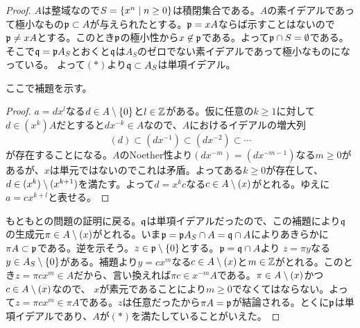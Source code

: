 \subsubsection{}%
\begin{proof}
  $A$は整域なので$S = \left\{ x^n \mathrel{} \middle| \mathrel{} n \geq 0 \right\}$は積閉集合である。$A$の素イデアルであって極小なもの$\mathfrak{p} \subset A$が与えられたとする。$\mathfrak{p} = xA$ならば示すことはないので$\mathfrak{p} \neq xA$とする。このとき$\mathfrak{p}$の極小性から$x \not\in \mathfrak{p}$である。よって$\mathfrak{p} \cap S = \emptyset$である。そこで$\mathfrak{q} = \mathfrak{p} A_S$とおくと$\mathfrak{q}$は$A_S $のゼロでない素イデアルであって極小なものになっている。
  よって$(*)$より$\mathfrak{q} \subset A_S$は単項イデアル。

  ここで補題を示す。
  \begin{proof}
    $a = dx^{l}$なる$d \in A \setminus \{0\}$と$l \in {\mathbb Z}$がある。仮に任意の$k \geq 1$に対して$d \in (x^k)A$だとすると$d x^{-k} \in A$なので、$A$におけるイデアルの増大列
    \[
    (d ) \subset (dx^{-1}) \subset (dx^{-2}) \subset \cdots
    \]
    が存在することになる。$A$のNoether性より$(dx^{-m}) = (dx^{-m-1})$なる$m \geq 0$があるが、$x$は単元ではないのでこれは矛盾。よってある$k \geq 0$が存在して、$d \in (x^k) \setminus (x^{k+1})$を満たす。よって$d = x^k c$なる$c \in A \setminus (x)$がとれる。ゆえに$a = cx^{k+l}$と表せる。
  \end{proof}

  もともとの問題の証明に戻る。$\mathfrak{q}$は単項イデアルだったので、この補題により$\mathfrak{q}$の生成元$\pi \in A \setminus (x)$がとれる。いま$\mathfrak{p} = \mathfrak{p} A_S \cap A = \mathfrak{q} \cap A$によりあきらかに$\pi A \subset \mathfrak{p}$である。逆を示そう。$z \in \mathfrak{p} \setminus \{0\}$とする。$\mathfrak{p} = \mathfrak{q} \cap A$より
  $z = \pi y$なる$y \in A_S \setminus \{ 0 \}$がある。補題より$y = cx^m$なる$c \in A \setminus (x)$と$m \in {\mathbb Z}$がとれる。このとき$z = \pi c x^m \in A$だから、言い換えれば$\pi c \in x^{-m} A$である。$\pi \in A \setminus (x)$かつ$c \in A \setminus (x)$なので、
  $x$が素元であることにより$m \geq 0$でなくてはならない。よって$z = \pi c x^m \in \pi A$である。$z$は任意だったから$\pi A = \mathfrak{p}$が結論される。とくに$\mathfrak{p}$は単項イデアルであり、$A$が$(*)$を満たしていることがいえた。
\end{proof}
